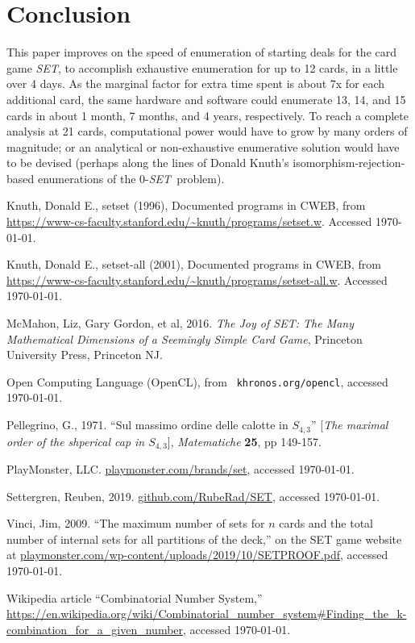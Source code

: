 \documentclass{article}
\newcommand{\SET}{{\em SET}}
\begin{document}
\section{Conclusion}
This paper improves on the speed of enumeration of starting deals for the card
game \SET, to accomplish exhaustive enumeration for up to 12 cards, in a little
over 4 days. As the marginal factor for extra time spent is about 7x for each
additional card, the same hardware and software could enumerate 13, 14, and 15
cards in about 1 month, 7 months, and 4 years, respectively. To reach a complete
analysis at 21 cards, computational power would have to grow by many orders of
magnitude; or an analytical or non-exhaustive enumerative solution would have to
be devised (perhaps along the lines of Donald Knuth's
isomorphism-rejection-based enumerations of the 0-\SET~problem).



\begin{thebibliography}{9} %


Knuth, Donald E., {\sc setset} (1996), Documented programs in
  CWEB, from
  \url{https://www-cs-faculty.stanford.edu/~knuth/programs/setset.w}. Accessed
  \today.

Knuth, Donald E., {\sc setset-all} (2001), Documented
  programs in CWEB, from
  \url{https://www-cs-faculty.stanford.edu/~knuth/programs/setset-all.w}. Accessed
  \today.

 McMahon, Liz, Gary Gordon, et al, 2016. {\em The Joy of SET: The
  Many Mathematical Dimensions of a Seemingly Simple Card Game}, Princeton
  University Press, Princeton NJ.

 Open Computing Language (OpenCL), from {\tt
  khronos.org/opencl}, accessed \today.

Pellegrino, G., 1971. ``Sul massimo ordine delle calotte in
  $S_{4,3}$'' [{\em The maximal order of the shperical cap in $S_{4,3}$}], {\em
  Matematiche} {\bf 25}, pp 149-157.

PlayMonster, LLC. \url{playmonster.com/brands/set}, accessed \today.

Settergren, Reuben, 2019. \url{github.com/RubeRad/SET}, accessed \today.
  
Vinci, Jim, 2009. ``The maximum number of sets for $n$ cards and
  the total number of internal sets for all partitions of the deck,'' on the
  SET game website at
  \url{playmonster.com/wp-content/uploads/2019/10/SETPROOF.pdf},
  accessed \today.

 Wikipedia article ``Combinatorial Number System,'' \url{https://en.wikipedia.org/wiki/Combinatorial_number_system#Finding_the_k-combination_for_a_given_number},
  accessed \today.

\end{thebibliography}
 
\end{document}
